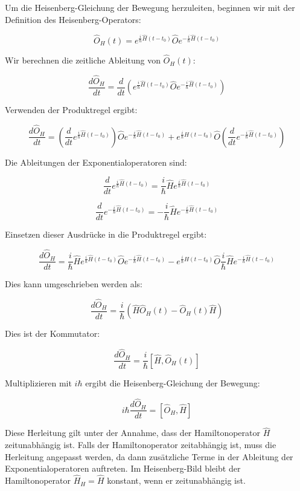 Um die Heisenberg-Gleichung der Bewegung herzuleiten, beginnen wir mit der Definition des Heisenberg-Operators:

\[
\hat{O}_H(t) = e^{\frac{i}{\hbar} \hat{H}(t-t_0)} \hat{O} e^{-\frac{i}{\hbar} \hat{H}(t-t_0)}
\]

Wir berechnen die zeitliche Ableitung von \(\hat{O}_H(t)\):

\[
\frac{d \hat{O}_H}{d t} = \frac{d}{d t} \left( e^{\frac{i}{\hbar} \hat{H}(t-t_0)} \hat{O} e^{-\frac{i}{\hbar} \hat{H}(t-t_0)} \right)
\]

Verwenden der Produktregel ergibt:

\[
\frac{d \hat{O}_H}{d t} = \left( \frac{d}{d t} e^{\frac{i}{\hbar} \hat{H}(t-t_0)} \right) \hat{O} e^{-\frac{i}{\hbar} \hat{H}(t-t_0)} + e^{\frac{i}{\hbar} \hat{H}(t-t_0)} \hat{O} \left( \frac{d}{d t} e^{-\frac{i}{\hbar} \hat{H}(t-t_0)} \right)
\]

Die Ableitungen der Exponentialoperatoren sind:

\[
\frac{d}{d t} e^{\frac{i}{\hbar} \hat{H}(t-t_0)} = \frac{i}{\hbar} \hat{H} e^{\frac{i}{\hbar} \hat{H}(t-t_0)}
\]

\[
\frac{d}{d t} e^{-\frac{i}{\hbar} \hat{H}(t-t_0)} = -\frac{i}{\hbar} \hat{H} e^{-\frac{i}{\hbar} \hat{H}(t-t_0)}
\]

Einsetzen dieser Ausdrücke in die Produktregel ergibt:

\[
\frac{d \hat{O}_H}{d t} = \frac{i}{\hbar} \hat{H} e^{\frac{i}{\hbar} \hat{H}(t-t_0)} \hat{O} e^{-\frac{i}{\hbar} \hat{H}(t-t_0)} - e^{\frac{i}{\hbar} \hat{H}(t-t_0)} \hat{O} \frac{i}{\hbar} \hat{H} e^{-\frac{i}{\hbar} \hat{H}(t-t_0)}
\]

Dies kann umgeschrieben werden als:

\[
\frac{d \hat{O}_H}{d t} = \frac{i}{\hbar} \left( \hat{H} \hat{O}_H(t) - \hat{O}_H(t) \hat{H} \right)
\]

Dies ist der Kommutator:

\[
\frac{d \hat{O}_H}{d t} = \frac{i}{\hbar} [\hat{H}, \hat{O}_H(t)]
\]

Multiplizieren mit \(i \hbar\) ergibt die Heisenberg-Gleichung der Bewegung:

\[
i \hbar \frac{d \hat{O}_H}{d t} = [\hat{O}_H, \hat{H}]
\]

Diese Herleitung gilt unter der Annahme, dass der Hamiltonoperator \(\hat{H}\) zeitunabhängig ist. Falls der Hamiltonoperator zeitabhängig ist, muss die Herleitung angepasst werden, da dann zusätzliche Terme in der Ableitung der Exponentialoperatoren auftreten. Im Heisenberg-Bild bleibt der Hamiltonoperator \(\hat{H}_H = \hat{H}\) konstant, wenn er zeitunabhängig ist.